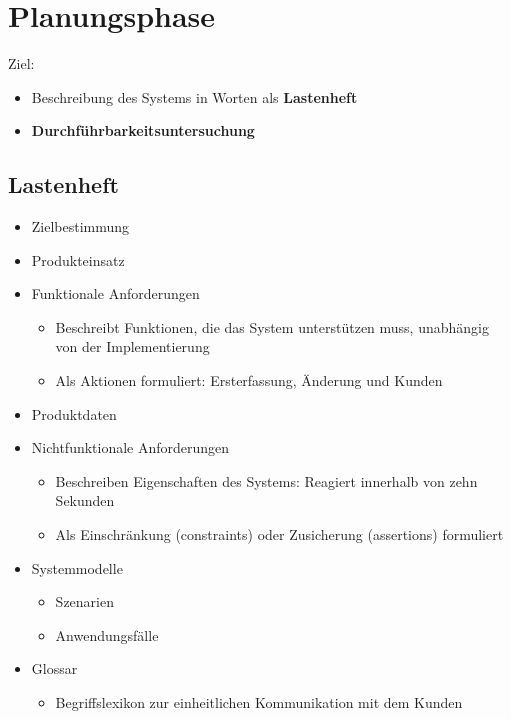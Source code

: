 \section{Planungsphase}

	Ziel:
	\begin{itemize}
		\item Beschreibung des Systems in Worten als \textbf{Lastenheft}
		\item \textbf{Durchführbarkeitsuntersuchung}
	\end{itemize}
		
		\subsection{Lastenheft}
			
			\begin{itemize}
				\item Zielbestimmung
				\item Produkteinsatz
				\item Funktionale Anforderungen
				\begin{itemize}
					\item Beschreibt Funktionen, die das System unterstützen muss, unabhängig von der Implementierung
					\item Als Aktionen formuliert: \dq Ersterfassung, Änderung und Kunden\dq
				\end{itemize}
					\item Produktdaten
					\item Nichtfunktionale Anforderungen
				\begin{itemize}
					\item Beschreiben Eigenschaften des Systems: \dq Reagiert innerhalb von zehn Sekunden\dq
					\item Als Einschränkung (constraints) oder Zusicherung (assertions) formuliert
				\end{itemize}
				\item Systemmodelle
				\begin{itemize}
					\item Szenarien
					\item Anwendungsfälle
				\end{itemize}
					\item Glossar
				\begin{itemize}
					\item Begriffslexikon zur einheitlichen Kommunikation mit dem Kunden
				\end{itemize}
			\end{itemize}
				
